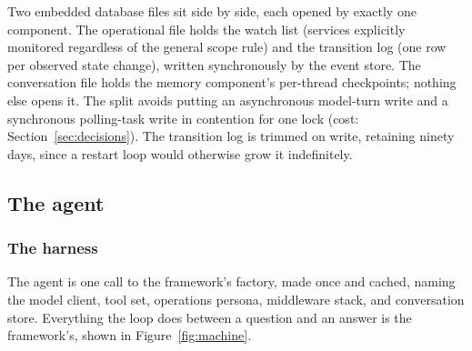 \documentclass[11pt,a4paper]{article}
\begin{document}
Two embedded database files sit side by side, each opened by exactly one component.
The operational file holds the watch list (services explicitly monitored regardless
of the general scope rule) and the transition log (one row per observed state
change), written synchronously by the event store. The conversation file holds the
memory component's per-thread checkpoints; nothing else opens it. The split avoids
putting an asynchronous model-turn write and a synchronous polling-task write in
contention for one lock (cost: Section~\ref{sec:decisions}). The transition log is
trimmed on write, retaining ninety days, since a restart loop would otherwise grow
it indefinitely.

\subsection{The agent}

\subsubsection{The harness}

The agent is one call to the framework's factory, made once and cached, naming the
model client, tool set, operations persona, middleware stack, and conversation
store. Everything the loop does between a question and an answer is the
framework's, shown in Figure~\ref{fig:machine}.
\end{document}
